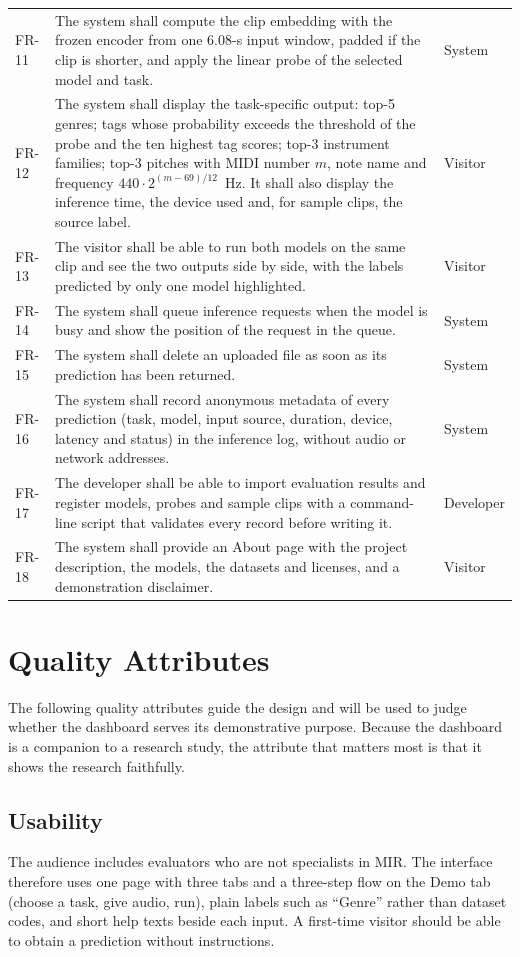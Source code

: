 \documentclass{FastFyp}
\begin{document}
{\begin{longtable}{P{1.3cm}P{11.25cm}P{2.0cm}}
FR-11 & The system shall compute the clip embedding with the frozen encoder from one 6.08-s input window, padded if the clip is shorter, and apply the linear probe of the selected model and task. & System\\
FR-12 & The system shall display the task-specific output: top-5 genres; tags whose probability exceeds the threshold of the probe and the ten highest tag scores; top-3 instrument families; top-3 pitches with MIDI number $m$, note name and frequency $440\cdot2^{(m-69)/12}$~Hz. It shall also display the inference time, the device used and, for sample clips, the source label. & Visitor\\
FR-13 & The visitor shall be able to run both models on the same clip and see the two outputs side by side, with the labels predicted by only one model highlighted. & Visitor\\
FR-14 & The system shall queue inference requests when the model is busy and show the position of the request in the queue. & System\\
FR-15 & The system shall delete an uploaded file as soon as its prediction has been returned. & System\\
FR-16 & The system shall record anonymous metadata of every prediction (task, model, input source, duration, device, latency and status) in the inference log, without audio or network addresses. & System\\
FR-17 & The developer shall be able to import evaluation results and register models, probes and sample clips with a command-line script that validates every record before writing it. & Developer\\
FR-18 & The system shall provide an About page with the project description, the models, the datasets and licenses, and a demonstration disclaimer. & Visitor\\
\end{longtable}}

\section{Quality Attributes}
\label{sec:srs-quality}
The following quality attributes guide the design and will be used to judge whether the dashboard serves its demonstrative purpose. Because the dashboard is a companion to a research study, the attribute that matters most is that it shows the research faithfully.

\subsection{Usability}
The audience includes evaluators who are not specialists in MIR. The interface therefore uses one page with three tabs and a three-step flow on the Demo tab (choose a task, give audio, run), plain labels such as ``Genre'' rather than dataset codes, and short help texts beside each input. A first-time visitor should be able to obtain a prediction without instructions.
\end{document}
